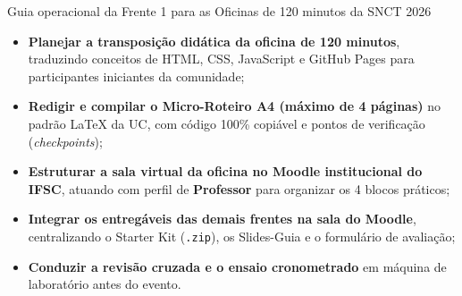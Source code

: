  {Guia operacional da Frente 1 para as Oficinas de 120 minutos da SNCT 2026}
  {\hspace{4pt}
   \hspace{4pt}
   }

\vspace{0.4em}

\begin{boxObjetivos}
\begin{itemize}
  \item \textbf{Planejar a transposição didática da oficina de 120 minutos}, traduzindo conceitos de HTML, CSS, JavaScript e GitHub Pages para participantes iniciantes da comunidade;
  \item \textbf{Redigir e compilar o Micro-Roteiro A4 (máximo de 4 páginas)} no padrão LaTeX da UC, com código 100\% copiável e pontos de verificação (\textit{checkpoints});
  \item \textbf{Estruturar a sala virtual da oficina no Moodle institucional do IFSC}, atuando com perfil de \textbf{Professor} para organizar os 4 blocos práticos;
  \item \textbf{Integrar os entregáveis das demais frentes na sala do Moodle}, centralizando o Starter Kit (\texttt{.zip}), os Slides-Guia e o formulário de avaliação;
  \item \textbf{Conduzir a revisão cruzada e o ensaio cronometrado} em máquina de laboratório antes do evento.
\end{itemize}
\end{boxObjetivos}

\begin{mapaAula}
\end{mapaAula}

